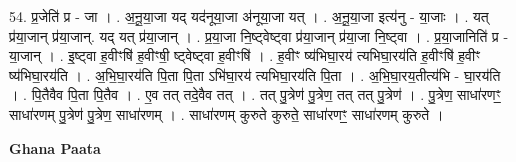 \documentclass[17pt]{extarticle}
\begin{document}
54. प्र॒जेति॑ प्र - जा । . अ॒नू॒या॒जा यद् यद॑नूया॒जा अ॑नूया॒जा यत् । . अ॒नू॒या॒जा इत्य॑नु - या॒जाः । . यत् प्र॑या॒जान् प्र॑या॒जान्. यद् यत् प्र॑या॒जान् । . प्र॒या॒जा नि॒ष्ट्वेष्ट्वा प्र॑या॒जान् प्र॑या॒जा नि॒ष्ट्वा । . प्र॒या॒जानिति॑ प्र - या॒जान् । . इ॒ष्ट्वा ह॒वीꣳषि॑ ह॒वीꣳषी॒ ष्ट्वेष्ट्वा ह॒वीꣳषि॑ । . ह॒वीꣳ ष्य॑भिघा॒रय॑ त्यभिघा॒रय॑ति ह॒वीꣳषि॑ ह॒वीꣳ ष्य॑भिघा॒रय॑ति । . अ॒भि॒घा॒रय॑ति पि॒ता पि॒ता ऽभि॑घा॒रय॑ त्यभिघा॒रय॑ति पि॒ता । . अ॒भि॒घा॒रय॒तीत्य॑भि - घा॒रय॑ति । . पि॒तैवैव पि॒ता पि॒तैव । . ए॒व तत् तदे॒वैव तत् । . तत् पु॒त्रेण॑ पु॒त्रेण॒ तत् तत् पु॒त्रेण॑ । . पु॒त्रेण॒ साधा॑रणꣳ॒॒ साधा॑रणम् पु॒त्रेण॑ पु॒त्रेण॒ साधा॑रणम् । . साधा॑रणम् कुरुते कुरुते॒ साधा॑रणꣳ॒॒ साधा॑रणम् कुरुते । \newline

\textbf{Ghana Paata } \newline
\end{document}

